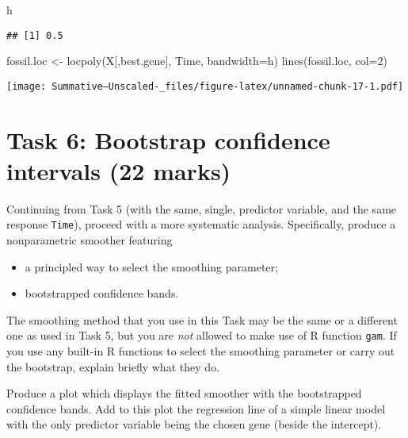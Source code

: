 \documentclass[
]{article}
\newenvironment{Shaded}{\begin{snugshade}}{\end{snugshade}}
\newcommand{\AttributeTok}[1]{\textcolor[rgb]{0.77,0.63,0.00}{#1}}
\newcommand{\DecValTok}[1]{\textcolor[rgb]{0.00,0.00,0.81}{#1}}
\newcommand{\FunctionTok}[1]{\textcolor[rgb]{0.00,0.00,0.00}{#1}}
\newcommand{\NormalTok}[1]{#1}
\newcommand{\OtherTok}[1]{\textcolor[rgb]{0.56,0.35,0.01}{#1}}
\providecommand{\tightlist}{%
  \setlength{\itemsep}{0pt}\setlength{\parskip}{0pt}}
\begin{document}
\begin{Shaded}
\begin{Highlighting}[]
\NormalTok{h}
\end{Highlighting}
\end{Shaded}

\begin{verbatim}
## [1] 0.5
\end{verbatim}

\begin{Shaded}
\begin{Highlighting}[]
\NormalTok{fossil.loc }\OtherTok{\textless{}{-}} \FunctionTok{locpoly}\NormalTok{(X[,best.gene], Time, }\AttributeTok{bandwidth=}\NormalTok{h)}
\FunctionTok{lines}\NormalTok{(fossil.loc, }\AttributeTok{col=}\DecValTok{2}\NormalTok{)}
\end{Highlighting}
\end{Shaded}

\texttt{[image: Summative--Unscaled-\_files/figure-latex/unnamed-chunk-17-1.pdf]}

\hypertarget{task-6-bootstrap-confidence-intervals-22-marks}{%
\section{Task 6: Bootstrap confidence intervals (22
marks)}\label{task-6-bootstrap-confidence-intervals-22-marks}}

Continuing from Task 5 (with the same, single, predictor variable, and
the same response \texttt{Time}), proceed with a more systematic
analysis. Specifically, produce a nonparametric smoother featuring

\begin{itemize}
\tightlist
\item
  a principled way to select the smoothing parameter;
\item
  bootstrapped confidence bands.
\end{itemize}

The smoothing method that you use in this Task may be the same or a
different one as used in Task 5, but you are \emph{not} allowed to make
use of R function \texttt{gam}. If you use any built-in R functions to
select the smoothing parameter or carry out the bootstrap, explain
briefly what they do.

Produce a plot which displays the fitted smoother with the bootstrapped
confidence bands. Add to this plot the regression line of a simple
linear model with the only predictor variable being the chosen gene
(beside the intercept).
\end{document}
